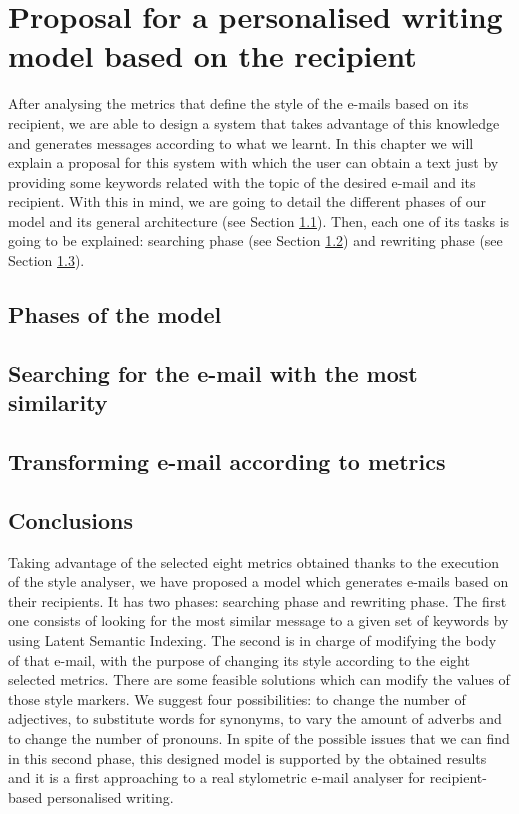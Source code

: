 \chapter{Proposal for a personalised writing model based on the recipient}\label{cap:proposal}


After analysing the metrics that define the style of the e-mails based on its recipient, we are able to design a system that takes advantage of this knowledge and generates messages according to what we learnt. In this chapter we will explain a proposal for this system with which the user can obtain a text just by providing some keywords related with the topic of the desired e-mail and its recipient. With this in mind, we are going to detail the different phases of our model and its general architecture (see Section \ref{sect:phasemod}). Then, each one of its tasks is going to be explained: searching phase (see Section \ref{sect:searchemail}) and rewriting phase (see Section \ref{sect:transemail}).

\section{Phases of the model}\label{sect:phasemod}


\section{Searching for the e-mail with the most similarity}\label{sect:searchemail}


\section{Transforming e-mail according to metrics}\label{sect:transemail}


\section{Conclusions}
Taking advantage of the selected eight metrics obtained thanks to the execution of the style analyser, we have proposed a model which generates e-mails based on their recipients. It has two phases: searching phase and rewriting phase. The first one consists of looking for the most similar message to a given set of keywords by using Latent Semantic Indexing. The second is in charge of modifying the body of that e-mail, with the purpose of changing its style according to the eight selected metrics. There are some feasible solutions which can modify the values of those style markers. We suggest four possibilities: to change the number of adjectives, to substitute words for synonyms, to vary the amount of adverbs and to change the number of pronouns. In spite of the possible issues that we can find in this second phase, this designed model is supported by the obtained results and it is a first approaching to a real stylometric e-mail analyser for recipient-based personalised writing.